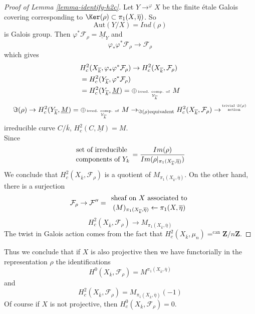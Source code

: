 \begin{proof}[Proof of Lemma \ref{lemma-identify-h2c}]
Let $Y\to^{\varphi}X$ be the finite \'etale Galois covering
corresponding to $\Ker(\rho) \subset \pi_1(X, \overline\eta)$. So
$$
\text{Aut}(Y/X)=Ind(\rho)
$$
is Galois group. Then $\varphi^*\mathcal{F}_\rho =\underline M_Y$ and
$$
\varphi_*\varphi^*\mathcal{F}_\rho\to \mathcal{F}_\rho
$$
which gives
\begin{align*}
& H_c^2(X_{\overline k}, \varphi_*\varphi^*\mathcal{F}_\rho) \to
H_c^2(X_{\overline k}, \mathcal{F}_\rho)\\
& =H_c^2(Y_{\overline k}, \varphi^*\mathcal{F}_\rho)\\
& =H_c^2(Y_{\overline k}, \underline M) = \oplus_{\text{irred.
comp. of }\atop Y_{\overline k}}M
\end{align*}
$$
\Im(\rho) \to H_c^2(Y_{\overline k}, \underline M) =
\oplus_{\text{irred. comp. of } \atop Y_{\overline k}}
M \to_{\Im(\rho) \text{equivalent}} H_c^2(X_{\overline k},
\mathcal{F}_{\rho}) \to^{\text{trivial }
\Im(\rho) \atop \text{action}}
$$
irreducible curve $C/\overline k$, $H_c^2(C, \underline M)=M$.
\\
Since
$$
{\text{set of irreducible }\atop\text{components of }Y_k} =
\frac{Im(\rho)}{Im(\rho|_{\pi_1(X_{\overline k}, \overline \eta)})}
$$
We conclude that $H_c^2(X_{\overline k}, \mathcal{F}_\rho)$ is a
quotient of $M_{\pi_1(X_{\overline k}, \overline \eta)}$. On the other hand,
there is a surjection
$$
\mathcal{F}_\rho\to \mathcal{F}'' = {\text{ sheaf on }
X\text{ associated to }\atop (M)_{\pi_1(X_{\overline k}, \overline
\eta)}\leftarrow\pi_1(X, \overline \eta)}
$$
$$
H_c^2(X_{\overline k}, \mathcal{F}_\rho)\to
M_{\pi_1(X_{\overline k}, \overline\eta)}
$$
The twist in Galois action comes from the fact that
$H_c^2(X_{\overline k}, \mu_n)=^{\text{can}} \mathbf{Z}/n\mathbf{Z}$.
\end{proof}

\begin{remark}
\label{remark-projective}
Thus we conclude that if $X$ is also projective then
we have functorially in the representation $\rho$
the identifications
$$
H^0(X_{\overline k}, \mathcal{F}_\rho) =
M^{\pi_1(X_{\overline k}, \overline\eta)}
$$
and
$$
H_c^2(X_{\overline k}, \mathcal{F}_\rho) =
M_{\pi_1(X_{\overline k}, \overline \eta)}(-1)
$$
Of course if $X$ is not projective, then
$H^0_c(X_{\overline{k}}, \mathcal{F}_\rho) = 0$.
\end{remark}


